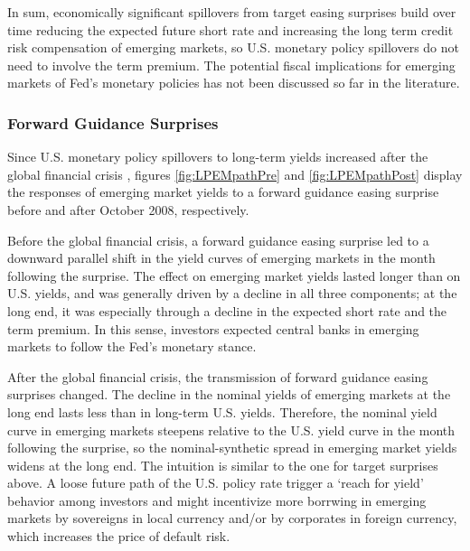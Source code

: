 {%
In sum, economically significant spillovers from target easing surprises build over time reducing the expected future short rate and increasing the long term credit risk compensation of emerging markets, so U.S. monetary policy spillovers do not need to involve the term premium.
The potential fiscal implications for emerging markets of Fed's monetary policies has not been discussed so far in the literature. 


\subsubsection{Forward Guidance Surprises}
\iftoggle{toclinks}{\gototoc}{} %

Since U.S. monetary policy spillovers to long-term yields increased after the global financial crisis \citep{Albaglietal:2019}, figures \ref{fig:LPEMpathPre} and \ref{fig:LPEMpathPost} display the responses of emerging market yields to a forward guidance easing surprise before and after October 2008, respectively.

Before the global financial crisis, a forward guidance easing surprise led to a downward parallel shift in the yield curves of emerging markets in the month following the surprise.
The effect on emerging market yields lasted longer than on U.S. yields, and was generally driven by a decline in all three components; at the long end, it was especially through a decline in the expected short rate and the term premium.
In this sense, investors expected central banks in emerging markets to follow the Fed's monetary stance. 

After the global financial crisis, the transmission of forward guidance easing surprises changed. 
The decline in the nominal yields of emerging markets at the long end lasts less than in long-term U.S. yields. 
Therefore, the nominal yield curve in emerging markets steepens relative to the U.S. yield curve in the month following the surprise, %
so the nominal-synthetic spread in emerging market yields widens at the long end.
The intuition is similar to the one for target surprises above. A loose future path of the U.S. policy rate trigger a `reach for yield' behavior among investors and might incentivize more borrwing in emerging markets by sovereigns in local currency and/or by corporates in foreign currency, which increases the price of default risk.

}
